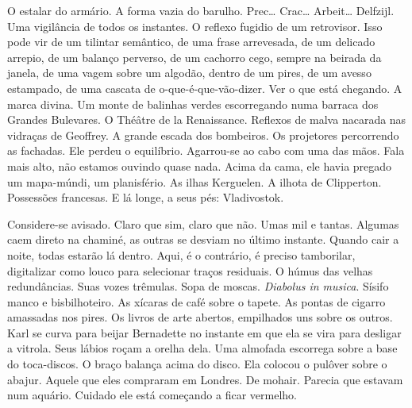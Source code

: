 O estalar do armário. A forma vazia do barulho. Prec\ldots{} Crac\ldots{}
Arbeit\ldots{} Delfzijl. Uma vigilância de todos os instantes. O reflexo
fugidio de um retrovisor. Isso pode vir de um tilintar semântico, de uma
frase arrevesada, de um delicado arrepio, de um balanço perverso, de um
cachorro cego, sempre na beirada da janela, de uma vagem sobre um
algodão, dentro de um pires, de um avesso estampado, de uma cascata de
o-que-é-que-vão-dizer. Ver o que está chegando. A marca divina. Um monte
de balinhas verdes escorregando numa barraca dos Grandes Bulevares. O
Théâtre de la Renaissance. Reflexos de malva nacarada nas vidraças de
Geoffrey. A grande escada dos bombeiros. Os projetores percorrendo as
fachadas. Ele perdeu o equilíbrio. Agarrou-se ao cabo com uma das mãos.
Fala mais alto, não estamos ouvindo quase nada. Acima da cama, ele havia
pregado um mapa-múndi, um planisfério. As ilhas Kerguelen. A ilhota de
Clipperton. Possessões francesas. E lá longe, a seus pés: Vladivostok.

Considere-se avisado. Claro que sim, claro que não. Umas mil e tantas.
Algumas caem direto na chaminé, as outras se desviam no último instante.
Quando cair a noite, todas estarão lá dentro. Aqui, é o contrário, é
preciso tamborilar, digitalizar como louco para selecionar traços
residuais. O húmus das velhas redundâncias. Suas vozes trêmulas. Sopa de
moscas. \emph{Diabolus in musica}. Sísifo manco e bisbilhoteiro. As
xícaras de café sobre o tapete. As pontas de cigarro amassadas nos
pires. Os livros de arte abertos, empilhados uns sobre os outros. Karl
se curva para beijar Bernadette no instante em que ela se vira para
desligar a vitrola. Seus lábios roçam a orelha dela. Uma almofada
escorrega sobre a base do toca-discos. O braço balança acima do disco.
Ela colocou o pulôver sobre o abajur. Aquele que eles compraram em
Londres. De mohair. Parecia que estavam num aquário. Cuidado ele está
começando a ficar vermelho.

